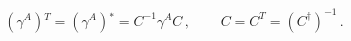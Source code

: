 \begin{equation}
\begin{array}{ll}
(\gamma^{A}){}^{T}=(\gamma^{A}){}^{\ast}={C}^{-1}\gamma^{A}{C}\,,~~~&~~~C=C^{T}=(C^{\dagger})^{-1}\,.
\end{array}\label{chargeC}
\end{equation}

